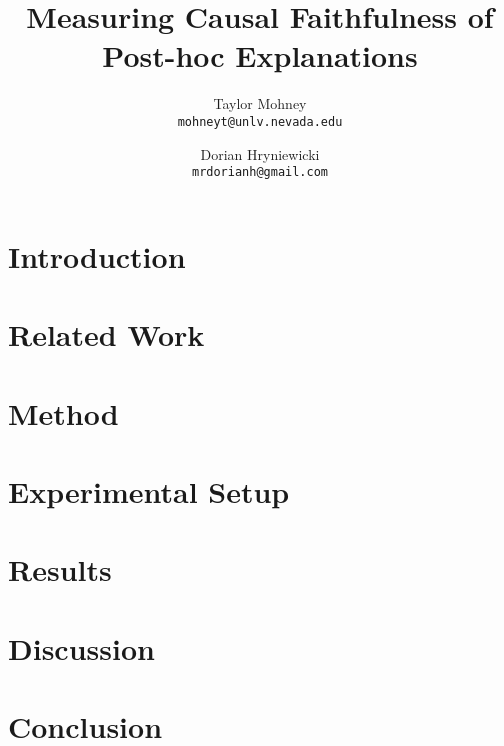 


\title{Measuring Causal Faithfulness of Post-hoc Explanations}
\author{Taylor Mohney\\\texttt{mohneyt@unlv.nevada.edu} \and Dorian Hryniewicki\\\texttt{mrdorianh@gmail.com}}
\date{\vspace{-1em}}


\maketitle

\begin{abstract}

\end{abstract}

\section{Introduction}


\section{Related Work}


\section{Method}


\section{Experimental Setup}


\section{Results}


\section{Discussion}


\section{Conclusion}


\clearpage



\clearpage
\appendix




